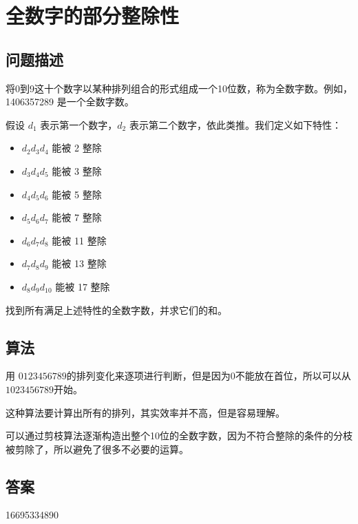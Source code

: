 \section{全数字的部分整除性}
\subsection{问题描述}
\begin{tcolorbox}
	将0到9这十个数字以某种排列组合的形式组成一个10位数，称为全数字数。例如，1406357289 是一个全数字数。

	假设 \( d_1 \) 表示第一个数字，\( d_2 \) 表示第二个数字，依此类推。我们定义如下特性：

	\begin{itemize}
		\item \( d_2d_3d_4 \) 能被 2 整除
		\item \( d_3d_4d_5 \) 能被 3 整除
		\item \( d_4d_5d_6 \) 能被 5 整除
		\item \( d_5d_6d_7 \) 能被 7 整除
		\item \( d_6d_7d_8 \) 能被 11 整除
		\item \( d_7d_8d_9 \) 能被 13 整除
		\item \( d_8d_9d_{10} \) 能被 17 整除
	\end{itemize}

	找到所有满足上述特性的全数字数，并求它们的和。

\end{tcolorbox}

\subsection{算法}
用 \( 0123456789 \)的排列变化来逐项进行判断，但是因为0不能放在首位，所以可以从 \( 1023456789 \)开始。

这种算法要计算出所有的排列，其实效率并不高，但是容易理解。

可以通过剪枝算法逐渐构造出整个10位的全数字数，因为不符合整除的条件的分枝被剪除了，所以避免了很多不必要的运算。

\subsection{答案}
16695334890
